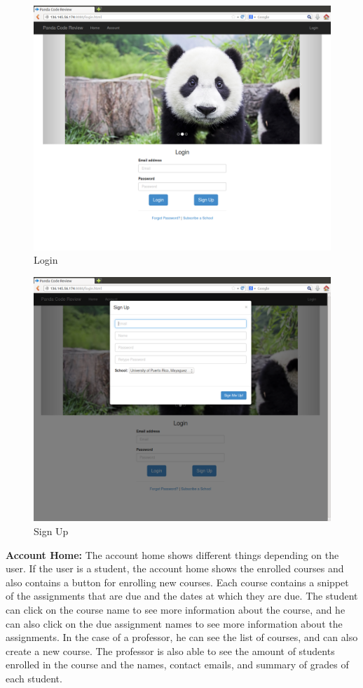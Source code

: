 \begin{figure}[H]
	\centering
	\includegraphics[width=\textwidth]{img/login}
	\caption{Login}
\end{figure}

\begin{figure}[H]
	\centering
	\includegraphics[width=\textwidth]{img/signup}
	\caption{Sign Up}
\end{figure}

\textbf{Account Home:} The account home shows different things
depending on the user. If the user is a student, the account home shows the
enrolled courses and also contains a button for enrolling new courses. Each
course contains a snippet of the assignments that are due and the dates
at which they are due. The student can click on the course name to see more
information about the course, and he can also click on the due assignment
names to see more information about the assignments. In the case of a professor,
he can see the list of courses, and can also create a new course.
The professor is also able to see the amount of students enrolled in the
course and the names, contact emails, and summary of grades of each student.

